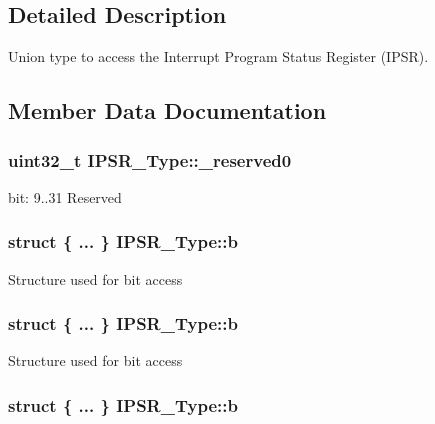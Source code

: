\subsection{Detailed Description}
Union type to access the Interrupt Program Status Register (I\-P\-S\-R). 

\subsection{Member Data Documentation}
\hypertarget{union_i_p_s_r___type_ad2eb0a06de4f03f58874a727716aa9aa}{
\subsubsection[{\-\_\-reserved0}]{\setlength{\rightskip}{0pt plus 5cm}uint32\-\_\-t I\-P\-S\-R\-\_\-\-Type\-::\-\_\-reserved0}}\label{union_i_p_s_r___type_ad2eb0a06de4f03f58874a727716aa9aa}
bit\-: 9..31 Reserved \hypertarget{union_i_p_s_r___type_add0d6497bd50c25569ea22b48a03ec50}{
\subsubsection[{b}]{\setlength{\rightskip}{0pt plus 5cm}struct \{ ... \}   I\-P\-S\-R\-\_\-\-Type\-::b}}\label{union_i_p_s_r___type_add0d6497bd50c25569ea22b48a03ec50}
Structure used for bit access \hypertarget{union_i_p_s_r___type_a81a5d310f19361bb4b17e7411650fdd9}{
\subsubsection[{b}]{\setlength{\rightskip}{0pt plus 5cm}struct \{ ... \}   I\-P\-S\-R\-\_\-\-Type\-::b}}\label{union_i_p_s_r___type_a81a5d310f19361bb4b17e7411650fdd9}
Structure used for bit access \hypertarget{union_i_p_s_r___type_aa11b32974d63dd51990089397c4f00f6}{
\subsubsection[{b}]{\setlength{\rightskip}{0pt plus 5cm}struct \{ ... \}   I\-P\-S\-R\-\_\-\-Type\-::b}}\label{union_i_p_s_r___type_aa11b32974d63dd51990089397c4f00f6}
